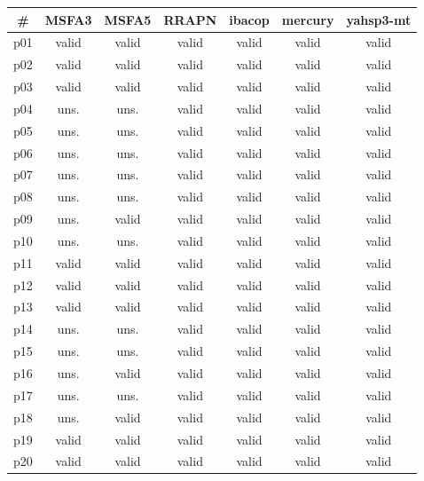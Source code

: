 \begin{tabular}{ccccccc}
\toprule
\textbf{\#} & \textbf{MSFA3} & \textbf{MSFA5} & \textbf{RRAPN} & \textbf{ibacop} & \textbf{mercury} & \textbf{yahsp3-mt}\\
\midrule
p01 & valid & valid & valid & valid & valid & valid\\
p02 & valid & valid & valid & valid & valid & valid\\
p03 & valid & valid & valid & valid & valid & valid\\
p04 & uns. & uns. & valid & valid & valid & valid\\
p05 & uns. & uns. & valid & valid & valid & valid\\
p06 & uns. & uns. & valid & valid & valid & valid\\
p07 & uns. & uns. & valid & valid & valid & valid\\
p08 & uns. & uns. & valid & valid & valid & valid\\
p09 & uns. & valid & valid & valid & valid & valid\\
p10 & uns. & uns. & valid & valid & valid & valid\\
p11 & valid & valid & valid & valid & valid & valid\\
p12 & valid & valid & valid & valid & valid & valid\\
p13 & valid & valid & valid & valid & valid & valid\\
p14 & uns. & uns. & valid & valid & valid & valid\\
p15 & uns. & uns. & valid & valid & valid & valid\\
p16 & uns. & valid & valid & valid & valid & valid\\
p17 & uns. & uns. & valid & valid & valid & valid\\
p18 & uns. & valid & valid & valid & valid & valid\\
p19 & valid & valid & valid & valid & valid & valid\\
p20 & valid & valid & valid & valid & valid & valid\\
\bottomrule
\end{tabular}

